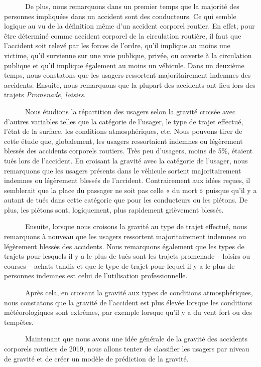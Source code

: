 \documentclass[french,]{tp}
\begin{document}
~~~~~~De plus, nous remarquons dans un premier temps que la majorité des personnes impliquées dans un accident sont des conducteurs. Ce qui semble logique au vu de la définition même d'un accident corporel routier. En effet, pour être déterminé comme accident corporel de la circulation routière, il faut que l'accident soit relevé par les forces de l'ordre, qu'il implique au moins une victime, qu'il survienne sur une voie publique, privée, ou ouverte à la circulation publique et qu'il implique également au moins un véhicule. Dans un deuxième temps, nous constatons que les usagers ressortent majoritairement indemnes des accidents. Ensuite, nous remarquons que la plupart des accidents ont lieu lors des trajets \emph{Promenade, loisirs}.

~~~~~~Nous étudions la répartition des usagers selon la gravité croisée avec d'autres variables telles que la catégorie de l'usager, le type de trajet effectué, l'état de la surface, les conditions atmosphériques, etc. Nous pouvons tirer de cette étude que, globalement, les usagers ressortaient indemnes ou légèrement blessés des accidents corporels routiers. Très peu d'usagers, moins de 5\%, étaient tués lors de l'accident. En croisant la gravité avec la catégorie de l'usager, nous remarquons que les usagers présents dans le véhicule sortent majoritairement indemnes ou légèrement blessés de l'accident. Contrairement aux idées reçues, il semblerait que la place du passager ne soit pas celle « du mort » puisque qu'il y a autant de tués dans cette catégorie que pour les conducteurs ou les piétons. De plus, les piétons sont, logiquement, plus rapidement grièvement blessés.

~~~~~~Ensuite, lorsque nous croisons la gravité au type de trajet effectué, nous remarquons à nouveau que les usagers ressortent majoritairement indemnes ou légèrement blessés des accidents. Nous remarquons également que les types de trajets pour lesquels il y a le plus de tués sont les trajets promenade -- loisirs ou courses -- achats tandis et que le type de trajet pour lequel il y a le plus de personnes indemnes est celui de l'utilisation professionnelle.

~~~~~~Après cela, en croisant la gravité aux types de conditions atmosphériques, nous constatons que la gravité de l'accident est plus élevée lorsque les conditions météorologiques sont extrêmes, par exemple lorsque qu'il y a du vent fort ou des tempêtes.

~~~~~~Maintenant que nous avons une idée générale de la gravité des accidents corporels routiers de 2019, nous allons tenter de classifier les usagers par niveau de gravité et de créer un modèle de prédiction de la gravité.
\end{document}
